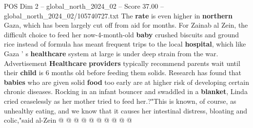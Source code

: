 \begin{textsample}{POS Dim 2 – global\_north\_2024\_02 – Score 37.00 – global\_north\_2024\_02/105740727.txt}
The \textbf{rate} is even higher in \textbf{northern} Gaza, which has been largely cut off from aid for months.
For Zainab al Zein, the difficult choice to feed her now-4-month-old \textbf{baby} crushed biscuits and ground rice instead of formula has meant frequent trips to the local \textbf{hospital}, which like Gaza ' s \textbf{healthcare} system at large is under deep strain from the war.
Advertisement \textbf{Healthcare} \textbf{providers} typically recommend parents wait until their \textbf{child} is 6 months old before feeding them solids.
Research has found that \textbf{babies} who are given solid \textbf{food} too early are at higher risk of developing certain chronic diseases.
Rocking in an infant bouncer and swaddled in a \textbf{blanket}, Linda cried ceaselessly as her mother tried to feed her.?"This is known, of course, as unhealthy eating, and we know that it causes her intestinal distress, bloating and colic,"said al-Zein @ @ @ @ @ @ @ @ @ @

\end{textsample}
